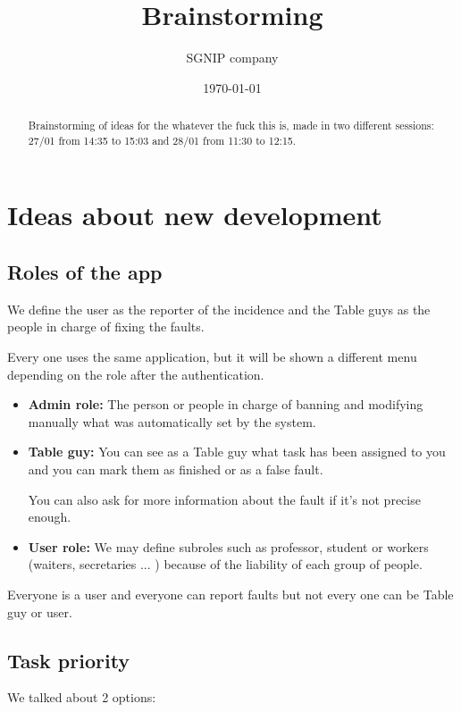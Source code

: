 \documentclass{article}
\title{Brainstorming}
\date{\today}
\author{SGNIP company}
\newcommand{\tbg}{Table guy\xspace}
\newcommand{\tbgs}{Table guys\xspace}
\begin{document}
\maketitle

\pagestyle{plain}

\begin{abstract} Brainstorming of ideas for the whatever the fuck this is, made in two different sessions: 27/01 from 14:35 to 15:03 and 28/01 from 11:30 to 12:15.
\end{abstract}

\section{Ideas about new development}

\subsection{Roles of the app}

We define the user as the reporter of the incidence and the \tbgs as the people in charge of fixing the faults.

Every one uses the same application, but it will be shown a different menu depending on the role after the authentication.

\begin{itemize}
\item \textbf{Admin role: } The person or people in charge of banning and modifying manually what was automatically set by the system.

\item\textbf{\tbg:} You can see as a \tbg what task has been assigned to you and you can mark them as finished or as a false fault.

You can also ask for more information about the fault if it's not precise enough.

\item \textbf{User role: }  We may define subroles such as professor, student or workers (waiters, secretaries ... ) because of the liability of each group of people.

\end{itemize}

Everyone is a user and everyone can report faults but not  every one can be \tbg or user.

\subsection{Task priority}
We talked about 2 options:
\end{document}
